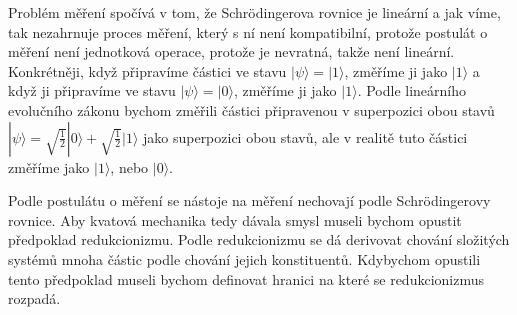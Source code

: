 Problém měření spočívá v tom, že Schrödingerova rovnice je lineární a jak víme, tak nezahrnuje proces měření, který s ní není kompatibilní, protože postulát o měření není jednotková operace, protože je nevratná, takže není lineární. Konkrétněji, když připravíme částici ve stavu $|\psi\rangle = |1\rangle$, změříme ji jako $|1\rangle$ a když ji připravíme ve stavu $|\psi\rangle = |0\rangle$, změříme ji jako $|1\rangle$. Podle lineárního evolučního zákonu bychom změřili částici připravenou v superpozici obou stavů $|\psi\rangle = \sqrt{\frac{1}{2}} |0\rangle + \sqrt{\frac{1}{2}} |1\rangle$ jako superpozici obou stavů, ale v realitě tuto částici změříme jako $|1\rangle$, nebo $|0\rangle$.

Podle postulátu o měření se nástoje na měření nechovají podle Schrödingerovy rovnice. Aby kvatová mechanika tedy dávala smysl museli bychom opustit předpoklad redukcionizmu. Podle redukcionizmu se dá derivovat chování složitých systémů mnoha částic podle chování jejich konstituentů. Kdybychom opustili tento předpoklad museli bychom definovat hranici na které se redukcionizmus rozpadá.



